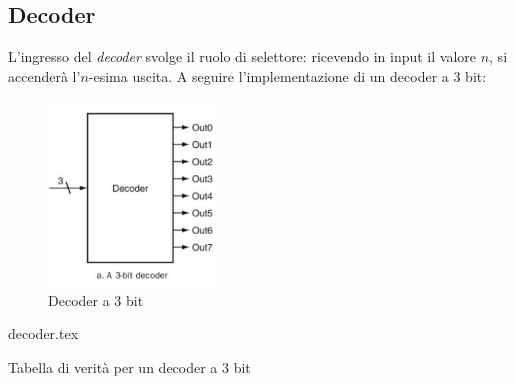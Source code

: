 \documentclass[class=book, crop=false]{standalone}
\begin{document}
\subsection{Decoder}
L'ingresso del \emph{decoder} svolge il ruolo di selettore: ricevendo in input il valore \(n\), si accenderà l'\(n\)-esima uscita. A seguire l'implementazione di un decoder a 3 bit:
\begin{figure}[H]
	\centering
	\includegraphics[width=0.4\textwidth,keepaspectratio]{3bit_decoder.png}
	\caption{Decoder a 3 bit}
\end{figure}
\begin{table}[!h]
	\centering
	{decoder.tex}
	\caption{Tabella di verità per un decoder a 3 bit}
	\label{decoder-3bit}
\end{table}
\end{document}
